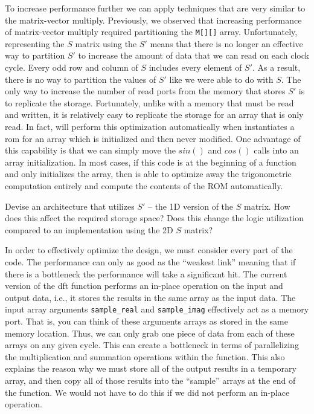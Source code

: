 To increase performance further we can apply techniques that are very similar to the matrix-vector multiply.  Previously, we observed that increasing performance of matrix-vector multiply required partitioning the \lstinline|M[][]| array.  Unfortunately, representing the $S$ matrix using the $S'$ means that there is no longer an effective way to partition $S'$ to increase the amount of data that we can read on each clock cycle. Every odd row and column of $S$ includes every element of $S'$.  As a result, there is no way to partition the values of $S'$ like we were able to do with $S$.  The only way to increase the number of read ports from the memory that stores $S'$ is to replicate the storage.  Fortunately, unlike with a memory that must be read and written, it is relatively easy to replicate the storage for an array that is only read.  In fact, \VHLS will perform this optimization automatically when instantiates a \gls{rom} for an array which is initialized and then never modified.  One advantage of this capability is that we can simply move the $sin()$ and $cos()$ calls into an array initialization.  In most cases, if this code is at the beginning of a function and only initializes the array, then \VHLS is able to optimize away the trigonometric computation entirely and compute the contents of the ROM automatically.

\begin{exercise}
Devise an architecture that utilizes $S'$ -- the 1D version of the $S$ matrix. How does this affect the required storage space? Does this change the logic utilization compared to an implementation using the 2D $S$ matrix? 
\end{exercise}

In order to effectively optimize the design, we must consider every part of the code. The performance can only as good as the ``weakest link'' meaning that if there is a bottleneck the performance will take a significant hit. The current version of the \gls{dft} function performs an in-place operation on the input and output data, i.e., it stores the results in the same array as the input data. The input array arguments \lstinline|sample_real| and \lstinline|sample_imag| effectively act as a memory port. That is, you can think of these arguments arrays as stored in the same memory location. Thus, we can only grab one piece of data from each of these arrays on any given cycle. This can create a bottleneck in terms of parallelizing the multiplication and summation operations within the function. This also explains the reason why we must store all of the output results in a temporary array, and then copy all of those results into the ``sample'' arrays at the end of the function. We would not have to do this if we did not perform an in-place operation. 

